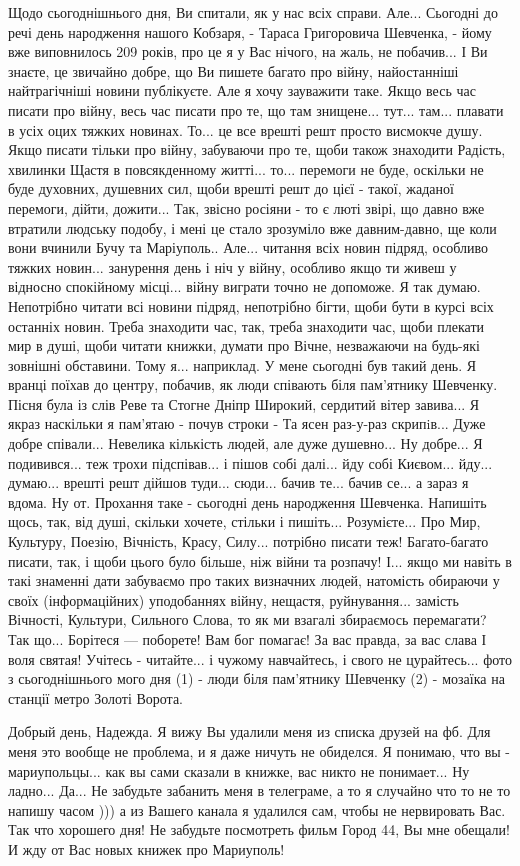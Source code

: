 Щодо сьогоднішнього дня, Ви спитали, як у нас всіх справи. Але... Сьогодні до
речі день народження нашого Кобзаря, - Тараса Григоровича Шевченка, - йому вже
виповнилось 209 років, про це я у Вас нічого, на жаль, не побачив... І Ви
знаєте, це звичайно добре, що Ви пишете багато про війну, найостанніші
найтрагічніші новини публікуєте. Але я хочу зауважити таке. Якщо весь час
писати про війну, весь час писати про те, що там знищене... тут... там...
плавати в усіх оцих тяжких новинах. То... це все врешті решт просто висмокче
душу. Якщо писати тільки про війну, забуваючи про те, щоби також знаходити
Радість, хвилинки Щастя в повсякденному житті... то... перемоги не буде,
оскільки не буде духовних, душевних сил, щоби врешті решт до цієї - такої,
жаданої перемоги, дійти, дожити... Так, звісно росіяни - то є люті звірі, що
давно вже втратили людську подобу, і мені це стало зрозуміло вже давним-давно,
ще коли вони вчинили Бучу та Маріуполь.. Але... читання всіх новин підряд,
особливо тяжких новин... занурення день і ніч у війну, особливо якщо ти живеш у
відносно спокійному місці... війну виграти точно не допоможе. Я так думаю.
Непотрібно читати всі новини підряд, непотрібно бігти, щоби бути в курсі всіх
останніх новин. Треба знаходити час, так, треба знаходити час, щоби плекати мир
в душі, щоби читати книжки, думати про Вічне, незважаючи на будь-які зовнішні
обставини. Тому я... наприклад. У мене сьогодні був такий день. Я вранці поїхав
до центру, побачив, як люди співають біля пам'ятнику Шевченку. Пісня була із
слів Реве та Стогне Дніпр Широкий, сердитий вітер завива... Я якраз наскільки я
пам'ятаю - почув строки - Та ясен раз-у-раз скрипiв... Дуже добре співали...
Невелика кількість людей, але дуже душевно... Ну добре... Я подивився... теж
трохи підспівав... і пішов собі далі... йду собі Києвом... йду... думаю...
врешті решт дійшов туди... сюди... бачив те... бачив се... а зараз я вдома. Ну
от. Прохання таке - сьогодні день народження Шевченка. Напишіть щось, так, від
душі, скільки хочете, стільки і пишіть... Розумієте... Про Мир, Культуру,
Поезію, Вічність, Красу, Силу... потрібно писати теж! Багато-багато писати,
так, і щоби цього було більше, ніж війни та розпачу! І... якщо ми навіть в такі
знаменні дати забуваємо про таких визначних людей, натомість обираючи у своїх
(інформаційних) уподобаннях війну, нещастя, руйнування... замість Вічності,
Культури, Сильного Слова, то як ми взагалі збираємось перемагати? Так що...
Борітеся — поборете! Вам бог помагає! За вас правда, за вас слава І воля
святая! Учітесь - читайте... і чужому навчайтесь, і свого не цурайтесь...  фото
з сьогоднішнього мого дня (1) - люди біля пам'ятнику Шевченку (2) - мозаїка на
станції метро Золоті Ворота.

Добрый день, Надежда. Я вижу Вы удалили меня из списка друзей на фб. Для меня
это вообще не проблема, и я даже ничуть не обиделся. Я понимаю, что вы -
мариупольцы... как вы сами сказали в книжке, вас никто не понимает... Ну
ладно... Да... Не забудьте забанить меня в телеграме, а то я случайно что то не
то напишу часом ))) а из Вашего канала я удалился сам, чтобы не нервировать
Вас. Так что хорошего дня! Не забудьте посмотреть фильм Город 44, Вы мне
обещали! И жду от Вас новых книжек про Мариуполь!
